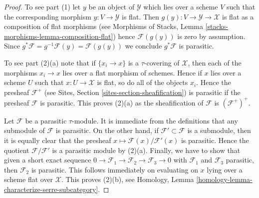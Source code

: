 \documentclass{stacks-project}
\theoremstyle{plain}
\theoremstyle{definition}
\theoremstyle{remark}
\numberwithin{equation}{subsection}
\begin{document}
\begin{proof}
To see part (1) let $y$ be an object of $\mathcal{Y}$ which lies
over a scheme $V$ such that the corresponding morphism $y : V \to \mathcal{Y}$
is flat. Then $g(y) : V \to \mathcal{Y} \to \mathcal{X}$ is flat
as a composition of flat morphisms (see
Morphisms of Stacks, Lemma \ref{stacks-morphisms-lemma-composition-flat})
hence $\mathcal{F}(g(y))$ is zero by assumption. Since
$g^*\mathcal{F} = g^{-1}\mathcal{F}(y) = \mathcal{F}(g(y))$ we conclude
$g^*\mathcal{F}$ is parasitic.

\medskip\noindent
To see part (2)(a) note that if $\{x_i \to x\}$ is a $\tau$-covering
of $\mathcal{X}$, then each of the morphisms $x_i \to x$ lies
over a flat morphism of schemes. Hence if $x$ lies over a scheme
$U$ such that $x : U \to \mathcal{X}$ is flat, so do all of the
objects $x_i$. Hence the presheaf $\mathcal{F}^+$ (see
Sites, Section \ref{sites-section-sheafification})
is parasitic if the presheaf $\mathcal{F}$ is
parasitic. This proves (2)(a) as the sheafification of $\mathcal{F}$
is $(\mathcal{F}^+)^+$.

\medskip\noindent
Let $\mathcal{F}$ be a parasitic $\tau$-module. It is immediate from the
definitions that any submodule of $\mathcal{F}$ is parasitic. On the other
hand, if $\mathcal{F}' \subset \mathcal{F}$ is a submodule, then it is
equally clear that the presheaf
$x \mapsto \mathcal{F}(x)/\mathcal{F}'(x)$
is parasitic. Hence the quotient $\mathcal{F}/\mathcal{F}'$ is a parasitic
module by (2)(a). Finally, we have to show that given a short exact sequence
$0 \to \mathcal{F}_1 \to \mathcal{F}_2 \to \mathcal{F}_3 \to 0$
with $\mathcal{F}_1$ and $\mathcal{F}_3$ parasitic, then $\mathcal{F}_2$
is parasitic. This follows immediately on evaluating on $x$ lying
over a scheme flat over $\mathcal{X}$. This proves (2)(b), see
Homology, Lemma \ref{homology-lemma-characterize-serre-subcategory}.


\end{proof}
\end{document}
